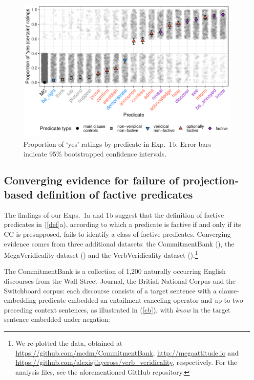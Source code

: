 \documentclass[11pt,fleqn]{article}
\newcommand{\6}{\mbox{$[\hspace*{-.6mm}[$}}
\newcommand{\9}{\mbox{$]\hspace*{-.6mm}]$}}
\begin{document}
\begin{figure}[H]

\centering
\includegraphics[width=.7\paperwidth]{../../results/8-projectivity-no-fact-binary/graphs/proportion-by-predicate-variability}
\caption{Proportion of `yes' ratings by predicate in Exp.~1b. Error bars indicate 95\% bootstrapped confidence intervals.}
\label{f-projectivity2}

\end{figure}


\subsection{Converging evidence for failure of projection-based definition of factive predicates}\label{s-converging1}

The findings of our Exps.~1a and 1b suggest that the definition of factive predicates in (\ref{def}a), according to which a predicate is factive if and only if its CC is presupposed, fails to identify a class of factive predicates. Converging evidence comes from three additional datasets: the CommitmentBank (\citealt*{demarneffe-etal-sub23}), the MegaVeridicality dataset (\citealt{white-rawlins-nels2018,white-etal2018b}) and the VerbVeridicality dataset (\citealt{ross-pavlick2019}).\footnote{We re-plotted the data, obtained at \url{https://github.com/mcdm/CommitmentBank}, \url{http://megaattitude.io} and \url{https://github.com/alexisjihyeross/verb_veridicality}, respectively. For the analysis files, see the aforementioned GitHub repository.}

The CommitmentBank is a collection of 1,200 naturally occurring English discourses from the Wall Street Journal, the British National Corpus and the Switchboard corpus: each discourse consists of a target sentence with a clause-embedding predicate embedded an entailment-canceling operator and up to two preceding context sentences, as illustrated in (\ref{cb}), with {\em know} in the target sentence embedded under negation:
\end{document}
